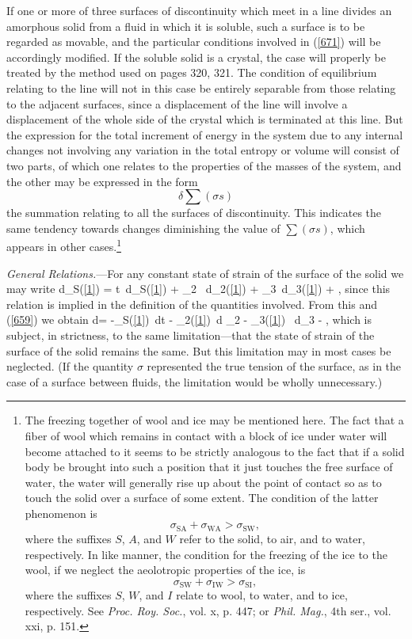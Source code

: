 \documentclass[12pt]{article}
\newcommand{\dd}{\delta}
\begin{document}
If one or more of three surfaces of discontinuity which meet in a line divides an amorphous solid from a fluid in which it is soluble, such a surface is to be regarded as movable, and the particular conditions involved in (\ref{671}) will be accordingly modified. If the soluble solid is a crystal, the case will properly be treated by the method used on pages 320, 321. The condition of equilibrium relating to the line will not in this case be entirely separable from those relating to the adjacent surfaces, since a displacement of the line will involve a displacement of the whole side of the crystal which is terminated at this line. But the expression for the total increment of energy in the system  due to any internal changes not involving any variation in the total entropy or volume will consist of two parts, of which one relates to the properties of the masses of the system, and the other may be expressed in the form
$$ \dd \sum(\sigma s)$$
the summation relating to all the surfaces of discontinuity. This indicates the same tendency towards changes diminishing the value of $\sum(\sigma s)$, which appears in other cases.\footnote{The freezing together of wool and ice may be mentioned here. The fact that a fiber of wool which remains in contact with a block of ice under water will become attached to it seems to be strictly analogous to the fact that if a solid body be brought into such a position that it just touches the free surface of water, the water will generally rise up about the point of contact so as to touch the solid over a surface of some extent. The condition of the latter phenomenon is
$$ \sigma_{\text{SA}} + \sigma_{\text{WA}} > \sigma_{\text{SW}} ,$$
where the suffixes $S$, $A$, and $W$ refer to the solid, to air, and to water, respectively. In like manner, the condition for the freezing of the ice to the wool, if we neglect the aeolotropic properties of the ice, is
$$ \sigma_{\text{SW}} + \sigma_{\text{IW}} > \sigma_{\text{SI}},$$
where the suffixes $S$, $W$, and $I$ relate to wool, to water, and to ice, respectively. See \textit{Proc. Roy. Soc.}, vol. x, p. 447; or \textit{Phil. Mag.}, 4th ser., vol. xxi, p. 151.}

\textit{General Relations.}---For any constant state of strain of the surface of the solid we may write
\eqs d\epsilon_{S(\ref{1})} = t\, d\eta_{S(\ref{1})} + \mu_2 \, d\Gamma_{2(\ref{1})} + \mu_3\, d\Gamma_{3(\ref{1})} + , \label{674} \eqe
since this relation is implied in the definition of the quantities involved. From this and (\ref{659}) we obtain
\eqs d\sigma = -\eta_{S(\ref{1})}\, dt - \Gamma_{2(\ref{1})}\, d \mu_2 - \Gamma_{3(\ref{1})} \, d\mu_3 - ,  \label{675} \eqe
which is subject, in strictness, to the same limitation---that the state of strain of the surface of the solid remains the same. But this limitation may in most cases be neglected. (If the quantity $\sigma$ represented the true tension of the surface, as in the case of a surface between fluids, the limitation would be wholly unnecessary.)
\end{document}
